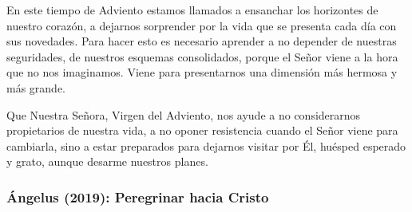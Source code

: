 \begin{body}
	En este tiempo de Adviento estamos llamados a ensanchar los horizontes de nuestro corazón, a dejarnos sorprender por la vida que se presenta cada día con sus novedades. Para hacer esto es necesario aprender a no depender de nuestras seguridades, de nuestros esquemas consolidados, porque el Señor viene a la hora que no nos imaginamos. Viene para presentarnos una dimensión más hermosa y más grande. 
	
	Que Nuestra Señora, Virgen del Adviento, nos ayude a no considerarnos propietarios de nuestra vida, a no oponer resistencia cuando el Señor viene para cambiarla, sino a estar preparados para dejarnos visitar por Él, huésped esperado y grato, aunque desarme nuestros planes.
\end{body}

\newpage
\subsubsection{Ángelus (2019): Peregrinar hacia Cristo}


